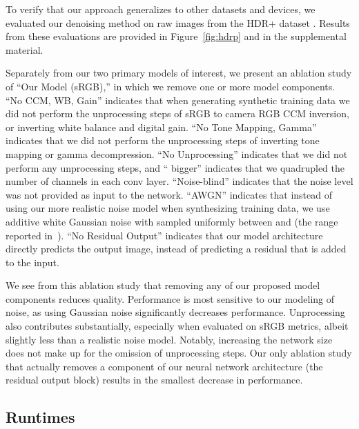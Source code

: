 \documentclass[10pt,twocolumn,letterpaper]{article}
\begin{document}
To verify that our approach generalizes to other datasets and devices, we evaluated our denoising method on raw images from the HDR+ dataset \cite{hasinoff2016burst}. Results from these evaluations are provided in Figure~\ref{fig:hdrp} and in the supplemental material.

Separately from our two primary models of interest, we present an ablation study of ``Our Model (sRGB),'' in which we remove one or more model components.
``No CCM, WB, Gain'' indicates that when generating synthetic training data we did not perform the unprocessing steps of sRGB to camera RGB CCM inversion, or inverting white balance and digital gain. ``No Tone Mapping, Gamma'' indicates that we did not perform the unprocessing steps of inverting tone mapping or gamma decompression. ``No Unprocessing'' indicates that we did not perform any unprocessing steps, and `` bigger'' indicates that we quadrupled the number of channels in each conv layer. ``Noise-blind'' indicates that the noise level was not provided as input to the network. ``AWGN'' indicates that instead of using our more realistic noise model when synthesizing training data, we use additive white Gaussian noise with  sampled uniformly between  and  (the range reported in~\cite{plotz2017cvpr}).
``No Residual Output'' indicates that our model architecture directly predicts the output image, instead of predicting a residual that is added to the input.

We see from this ablation study that removing any of our proposed model components reduces quality. Performance is most sensitive to our modeling of noise, as using Gaussian noise significantly decreases performance.
Unprocessing also contributes substantially, especially when evaluated on sRGB metrics, albeit slightly less than a realistic noise model. 
Notably, increasing the network size does not make up for the omission of unprocessing steps.
Our only ablation study that actually removes a component of our neural network architecture (the residual output block) results in the smallest decrease in performance.

\subsection{Runtimes}
\label{sec:runtimes}
\end{document}
